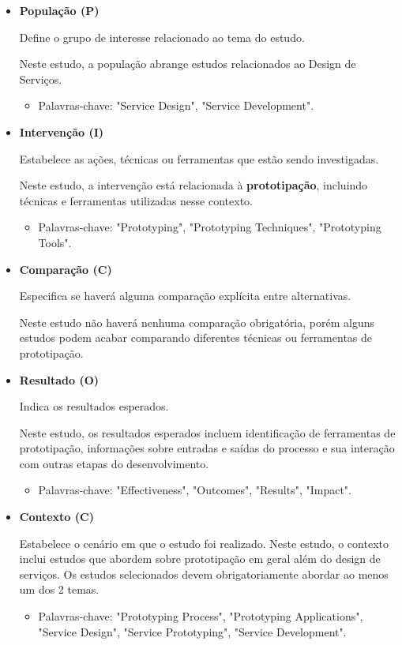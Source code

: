 \begin{itemize}
	\item \textbf{População (P)}
	
	Define o grupo de interesse relacionado ao tema do estudo.
	
	Neste estudo, a população abrange estudos relacionados ao Design de Serviços.
	\begin{itemize}
		\item Palavras-chave: "Service Design", "Service Development".
	\end{itemize}
	
	\item \textbf{Intervenção (I)}
	
	Estabelece as ações, técnicas ou ferramentas que estão sendo investigadas.
	
	Neste estudo, a intervenção está relacionada à \textbf{prototipação}, incluindo técnicas e ferramentas utilizadas nesse contexto.
	
	\begin{itemize}
		\item Palavras-chave: "Prototyping", "Prototyping Techniques", "Prototyping Tools".
	\end{itemize}
	
	\item \textbf{Comparação (C)}
	
	Especifica se haverá alguma comparação explícita entre alternativas.
	
	Neste estudo não haverá nenhuma comparação obrigatória, porém alguns estudos podem acabar comparando diferentes técnicas ou ferramentas de prototipação. 
	
	\item \textbf{Resultado (O)}
	
	Indica os resultados esperados.
	
	Neste estudo, os resultados esperados incluem identificação de ferramentas de prototipação, informações sobre entradas e saídas do processo e sua interação com outras etapas do desenvolvimento.
	
	\begin{itemize}
		\item Palavras-chave: "Effectiveness", "Outcomes", "Results", "Impact".
	\end{itemize} 
	
	\item \textbf{Contexto (C)}
	
	Estabelece o cenário em que o estudo foi realizado.
	Neste estudo, o contexto inclui estudos que abordem sobre prototipação em geral além do design de serviços. Os estudos selecionados devem obrigatoriamente abordar ao menos um dos 2 temas.
	
	\begin{itemize}
		\item Palavras-chave: "Prototyping Process", "Prototyping Applications", "Service Design", "Service Prototyping", "Service Development".
	\end{itemize}
	
\end{itemize}

